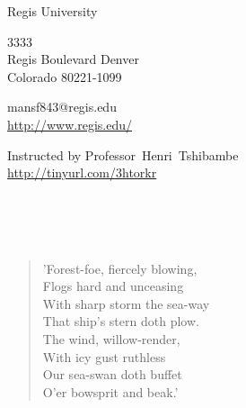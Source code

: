 \documentclass[11pt,a4paper]{scrartcl} %
\begin{document}
\pagecolor{Gray!20!Bittersweet!10}
\begin{cv}{}
        \begin{cvlist}{\textcolor{Sepia}{}}\label{PersDat}  
            \item   Regis University
            \item   3333\\
                    Regis Boulevard Denver \\	
                    Colorado 80221-1099
            \item   mansf843@regis.edu\\				
                    \url{http://www.regis.edu/}				
        \end{cvlist}
        \begin{cvlist}{}\label{irgendwas}
            \item Instructed by Professor~Henri~Tshibambe\\
             \url{http://tinyurl.com/3htorkr}
        \end{cvlist}
    \end{cv}
\clearpage

\noindent
\textcolor{OliveGreen}{}\\
\textcolor{Sepia}{\\
\citet[chapter 60]{egil}}\\
\begin{verse}
'Forest-foe, fiercely blowing,\\
Flogs hard and unceasing\\
With sharp storm the sea-way\\
That ship's stern doth plow.\\
The wind, willow-render,\\
With icy gust ruthless\\
Our sea-swan doth buffet\\
O'er bowsprit and beak.'\\
\end{verse}
\clearpage
\title{\textcolor{OliveGreen}{\rmfamily\normalfont{}}}
    \author{\textcolor{Sepia}{}}
    \date{} %
    
    \maketitle
    
\end{document}
